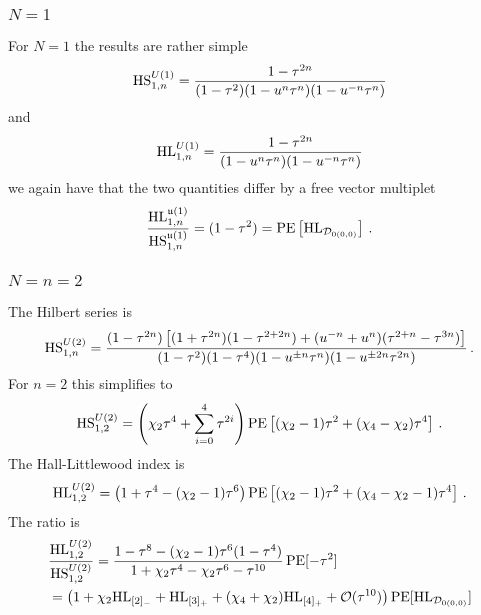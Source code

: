 \documentclass[main.tex]{subfiles}
\begin{document}
\subsubsection{$N=1$}
For $N=1$ the results are rather simple
\begin{equation}
\textrm{HS}^{U(1)}_{1,n}=\frac{1-\tau^{2n}}{(1-\tau^2)(1-u^n\tau^n)(1-u^{-n}\tau^n)}
\end{equation}
and
\begin{equation}
\textrm{HL}^{U(1)}_{1,n}=\frac{1-\tau^{2n}}{(1-u^n\tau^n)(1-u^{-n}\tau^n)}
\end{equation}
we again have that the two quantities differ by a free vector multiplet
\begin{equation}
\frac{\textrm{HL}^{\mathfrak{u}(1)}_{1,n}}{\textrm{HS}^{\mathfrak{u}(1)}_{1,n}}=(1-\tau^2)=\operatorname{\mathrm{PE}}\left[\textrm{HL}_{\mathcal{D}_{0(0,0)}}\right]\,.
\end{equation}
\subsubsection{$N=n=2$}
The Hilbert series is
\begin{equation}
\textrm{HS}^{U(2)}_{1,n}=\frac{(1-\tau^{2n})\left[(1+\tau^{2n})(1-\tau^{2+2n})+(u^{-n}+u^n)(\tau^{2+n}-\tau^{3n})\right]}{(1-\tau^2)(1-\tau^4)(1-u^{\pm n}\tau^n)(1-u^{\pm2n}\tau^{2n})}\,.
\end{equation}
For $n=2$ this simplifies to
\begin{equation}
\textrm{HS}^{U(2)}_{1,2}=\left(\chi_2\tau^{4}+\sum_{i=0}^4\tau^{2i}\right)\operatorname{\mathrm{PE}}\left[(\chi_2-1)\tau^2+(\chi_4-\chi_2)\tau^4\right]\,.
\end{equation}
The Hall-Littlewood index is
\begin{equation}
\textrm{HL}^{U(2)}_{1,2}=\left(1+\tau^4-(\chi_2-1)\tau^6\right)\operatorname{\mathrm{PE}}\left[(\chi_2-1)\tau^2+(\chi_4-\chi_2-1)\tau^4\right]\,.
\end{equation}
The ratio is
\begin{align}
&\frac{\textrm{HL}^{U(2)}_{1,2}}{\textrm{HS}^{U(2)}_{1,2}}=\frac{1-\tau^8-(\chi_2-1)\tau^6(1-\tau^4)}{1+\chi_2\tau^4-\chi_2\tau^6-\tau^{10}}\operatorname{\mathrm{PE}}[-\tau^2]\\
&=\left(1+\chi_2\textrm{HL}_{[2]_-}+\textrm{HL}_{[3]_+}+(\chi_4+\chi_2)\textrm{HL}_{[4]_+}+\mathcal{O}(\tau^{10})\right)\operatorname{\mathrm{PE}}[\textrm{HL}_{\mathcal{D}_{0(0,0)}}]
\end{align}
\end{document}
